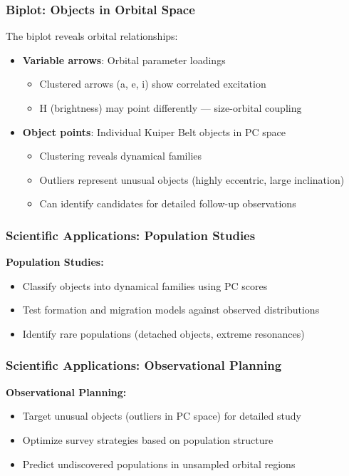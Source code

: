\documentclass[aspectratio=169]{beamer}
\begin{document}
\begin{frame}
    \frametitle{Biplot: Objects in Orbital Space}
    The biplot reveals orbital relationships:
    \begin{itemize}
        \item \textbf{Variable arrows}: Orbital parameter loadings \pause
              \begin{itemize}
                  \item Clustered arrows (a, e, i) show correlated excitation \pause
                  \item H (brightness) may point differently — size-orbital coupling \pause
              \end{itemize}
        \item \textbf{Object points}: Individual Kuiper Belt objects in PC space \pause
              \begin{itemize}
                  \item Clustering reveals dynamical families \pause
                  \item Outliers represent unusual objects (highly eccentric, large inclination) \pause
                  \item Can identify candidates for detailed follow-up observations \pause
              \end{itemize}
    \end{itemize}
\end{frame}

\begin{frame}
    \frametitle{Scientific Applications: Population Studies}
    \textbf{Population Studies:}
    \begin{itemize}
        \item Classify objects into dynamical families using PC scores \pause
        \item Test formation and migration models against observed distributions \pause
        \item Identify rare populations (detached objects, extreme resonances) \pause
    \end{itemize}
\end{frame}

\begin{frame}
    \frametitle{Scientific Applications: Observational Planning}
    \textbf{Observational Planning:}
    \begin{itemize}
        \item Target unusual objects (outliers in PC space) for detailed study \pause
        \item Optimize survey strategies based on population structure \pause
        \item Predict undiscovered populations in unsampled orbital regions \pause
    \end{itemize}
\end{frame}
\end{document}
